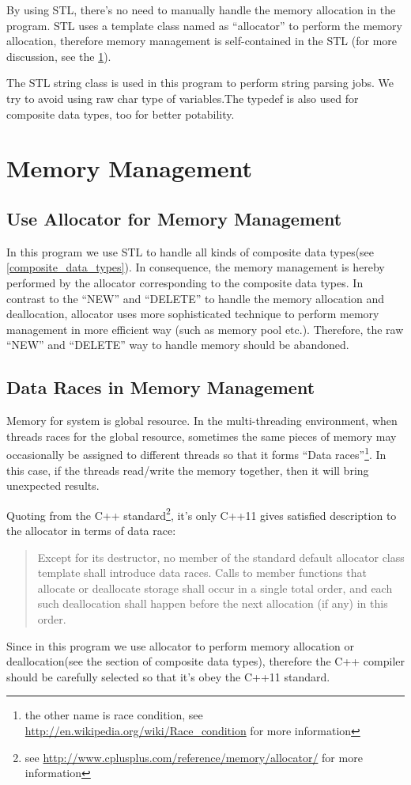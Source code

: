 By using STL, there's no need to manually handle the memory allocation
in the program. STL uses a template class named as ``allocator'' to perform
the memory allocation, therefore memory management is self-contained
in the STL (for more discussion, see the \ref{mem_management}).

The STL string class is used in this program to perform string parsing jobs.
We try to avoid using raw char type of variables.The typedef is also used 
for composite data types, too for better potability. 

\section{Memory Management}
\label{mem_management}
%
%
\subsection{Use Allocator for Memory Management}
%
%
%
In this program we use STL to handle all kinds of composite data types(see
\ref{composite_data_types}). In consequence, the memory management is hereby
performed by the allocator corresponding to the composite data types. 
In contrast to the ``NEW'' and ``DELETE'' to handle the memory allocation
and deallocation, allocator uses more sophisticated technique to perform
memory management in more efficient way (such as memory pool etc.). Therefore,
the raw ``NEW'' and ``DELETE'' way to handle memory should be abandoned.      

\subsection{Data Races in Memory Management}
%
%
%
Memory for system is global resource. In the multi-threading environment,
when threads races for the global resource, sometimes the same pieces of 
memory may occasionally be assigned to different threads so that it forms 
``Data races''\footnote{the other name is race condition, see 
\url{http://en.wikipedia.org/wiki/Race_condition} for more information}.
In this case, if the threads read/write the memory together, then it will
bring unexpected results.

Quoting from the C++ standard\footnote{see 
\url{http://www.cplusplus.com/reference/memory/allocator/} for more information},
it's only C++11 gives satisfied description to the allocator in terms of 
data race:
\begin{quote}
Except for its destructor, no member of the standard default allocator class 
template shall introduce data races. Calls to member functions that allocate 
or deallocate storage shall occur in a single total order, and each such deallocation 
shall happen before the next allocation (if any) in this order.
\end{quote}
Since in this program we use allocator to perform memory allocation or deallocation(see
the section of composite data types), therefore the C++ compiler should be carefully
selected so that it's obey the C++11 standard. 

